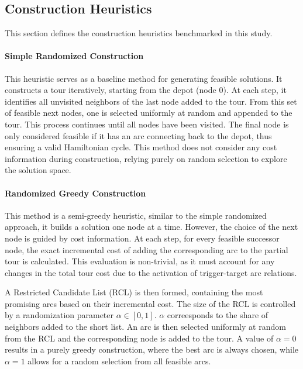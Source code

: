 \documentclass[twocolumn, switch]{article} %
\begin{document}
\subsection{Construction Heuristics}
This section defines the construction heuristics benchmarked in this study.

\paragraph{Simple Randomized Construction}
This heuristic serves as a baseline method for generating feasible solutions. It constructs a tour iteratively, starting from the depot (node 0). At each step, it identifies all unvisited neighbors of the last node added to the tour. From this set of feasible next nodes, one is selected uniformly at random and appended to the tour. This process continues until all nodes have been visited. The final node is only considered feasible if it has an arc connecting back to the depot, thus ensuring a valid Hamiltonian cycle. This method does not consider any cost information during construction, relying purely on random selection to explore the solution space.

\paragraph{Randomized Greedy Construction}
This method is a semi-greedy heuristic, similar to the simple randomized approach, it builds a solution one node at a time. However, the choice of the next node is guided by cost information. At each step, for every feasible successor node, the exact incremental cost of adding the corresponding arc to the partial tour is calculated. This evaluation is non-trivial, as it must account for any changes in the total tour cost due to the activation of trigger-target arc relations.

A Restricted Candidate List (RCL) is then formed, containing the most promising arcs based on their incremental cost. The size of the RCL is controlled by a randomization parameter $\alpha \in [0, 1]$. $\alpha$ correesponds to the share of neighbors added to the short list. An arc is then selected uniformly at random from the RCL and the corresponding node is added to the tour. A value of $\alpha = 0$ results in a purely greedy construction, where the best arc is always chosen, while $\alpha = 1$ allows for a random selection from all feasible arcs.
  
\end{document}
